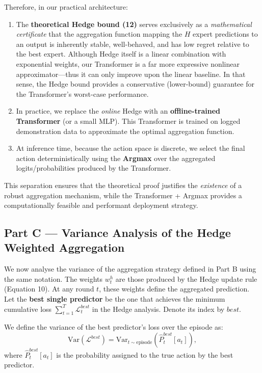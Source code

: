 \documentclass[11pt]{article}
\begin{document}
Therefore, in our practical architecture:
\begin{enumerate}
    \item The \textbf{theoretical Hedge bound (12)} serves exclusively as a \emph{mathematical certificate} that the aggregation function mapping the \(H\) expert predictions to an output is inherently stable, well-behaved, and has low regret relative to the best expert.  
    Although Hedge itself is a linear combination with exponential weights, our Transformer is a far more expressive nonlinear approximator—thus it can only improve upon the linear baseline. In that sense, the Hedge bound provides a conservative (lower-bound) guarantee for the Transformer's worst-case performance.
    \item In practice, we replace the \emph{online} Hedge with an \textbf{offline-trained Transformer} (or a small MLP). This Transformer is trained on logged demonstration data to approximate the optimal aggregation function.
    \item At inference time, because the action space is discrete, we select the final action deterministically using the \textbf{Argmax} over the aggregated logits/probabilities produced by the Transformer.
\end{enumerate}

This separation ensures that the theoretical proof justifies the \emph{existence} of a robust aggregation mechanism, while the Transformer + Argmax provides a computationally feasible and performant deployment strategy.

\subsection{Part C — Variance Analysis of the Hedge Weighted Aggregation}

We now analyse the variance of the aggregation strategy defined in Part B using the same notation. The weights \(w^h_t\) are those produced by the Hedge update rule (Equation 10). At any round \(t\), these weights define the aggregated prediction. Let the \textbf{best single predictor} be the one that achieves the minimum cumulative loss \( \sum_{t=1}^T \mathcal{L}^{best}_t \) in the Hedge analysis. Denote its index by \(best\).

We define the variance of the best predictor's loss over the episode as:
\[
\text{Var}(\mathcal{L}^{best})
=
\text{Var}_{t \sim \text{episode}} \left( \hat{P}^{best}_t[a_t] \right), \tag{13}
\]
where \(\hat{P}^{best}_t[a_t]\) is the probability assigned to the true action by the best predictor.
\end{document}
